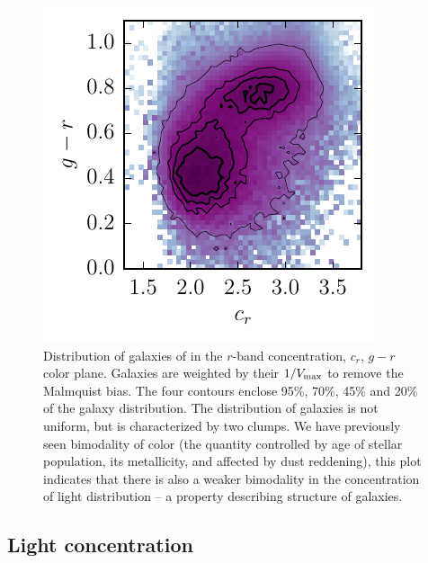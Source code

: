 \begin{figure}[!ht]
\centerline{
\includegraphics[scale=2.2]{fig/cr_gr.pdf}}
\vspace{-5mm}
\caption{Distribution of galaxies of in the $r$-band concentration, $c_r$, $g-r$ color plane. Galaxies are weighted by their $1/V_{\rm max}$ to remove the Malmquist bias. The four contours enclose 95\%, 70\%, 45\% and 20\% of the galaxy distribution. 
The distribution of galaxies is not uniform, but is characterized by two clumps. We have previously seen bimodality of color (the quantity controlled by age of stellar population, its metallicity, and affected by dust reddening), this plot indicates that there is also a weaker bimodality in the concentration of
light distribution -- a property describing structure of galaxies. 
\label{fig:gal_crgr}}
\end{figure}
\subsection{Light concentration}

